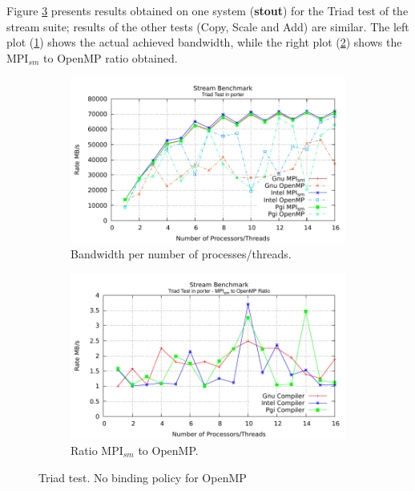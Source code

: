 \medskip

Figure \ref{fig:TriadTestBefore} presents results obtained on one system (\textbf{stout}) for the Triad test of the stream suite; results of the other tests (Copy, Scale and Add) are similar. The left plot (\ref{fig:TriadBefore}) shows the actual achieved bandwidth, while the right plot (\ref{fig:TriadRatioBefore}) shows the MPI$_{sm}$ to OpenMP ratio obtained.
 
\medskip

\begin{figure} [h!]
    \centering
    \captionsetup{justification=centering, singlelinecheck=false}
    \begin{subfigure}{.6\textwidth}
      \hspace*{-1.5cm} 
      \includegraphics[width=0.95\linewidth]{Plots/streamBenchmark/porter-TriadBefore.pdf}
      \caption[]{Bandwidth per number of processes/threads.}
      \label{fig:TriadBefore}
    \end{subfigure}%
    \begin{subfigure}{.6\textwidth}
      \hspace*{-1.5cm} 
      \includegraphics[width=0.95\linewidth]{Plots/streamBenchmark/porter-TriadRatioBefore.pdf}
      \caption{Ratio MPI$_{sm}$ to OpenMP.}
      \label{fig:TriadRatioBefore}
    \end{subfigure}
    \caption{Triad test. No binding policy for OpenMP}
\label{fig:TriadTestBefore}
\end{figure}


